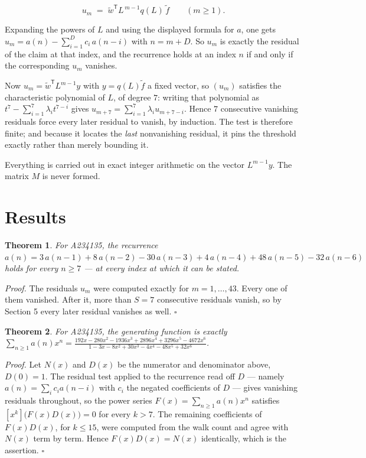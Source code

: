 \documentclass[11pt]{article}
\newtheorem{theorem}{Theorem}
\theoremstyle{definition}
\begin{document}
\[u_m \;=\; \tilde w^{\mathsf T} L^{\,m-1} q(L)\,\tilde f \qquad (m \ge 1).\]

Expanding the powers of $L$ and using the displayed formula for $a$, one gets $u_m = a(n) - \sum_{i=1}^{D} c_i\,a(n-i)$ with $n = m + D$. So $u_m$ is exactly the residual of the claim at that index, and the recurrence holds at an index $n$ if and only if the corresponding $u_m$ vanishes.

Now $u_m = \tilde w^{\mathsf T} L^{m-1} y$ with $y = q(L)\tilde f$ a fixed vector, so $(u_m)$ satisfies the characteristic polynomial of $L$, of degree $7$: writing that polynomial as $t^{7} - \sum_{i=1}^{7} \lambda_i t^{7-i}$ gives $u_{m+7} = \sum_{i=1}^{7} \lambda_i u_{m+7-i}$. Hence $7$ consecutive vanishing residuals force every later residual to vanish, by induction. The test is therefore finite; and because it locates the {\itshape last} nonvanishing residual, it pins the threshold exactly rather than merely bounding it.

Everything is carried out in exact integer arithmetic on the vector $L^{m-1}y$. The matrix $M$ is never formed.

\section{Results}

\begin{theorem} For A234135, the recurrence $a(n) = 3\,a(n-1) + 8\,a(n-2) - 30\,a(n-3) + 4\,a(n-4) + 48\,a(n-5) - 32\,a(n-6)$ holds for every $n \ge 7$ --- at every index at which it can be stated.\end{theorem}

{\itshape Proof.} The residuals $u_m$ were computed exactly for $m = 1,\dots,43$. Every one of them vanished. After it, more than $S = 7$ consecutive residuals vanish, so by Section 5 every later residual vanishes as well. $\square$

\begin{theorem} For A234135, the generating function is exactly $\sum_{n\ge 1} a(n)x^n = \frac{192x - 280x^{2} - 1936x^{3} + 2896x^{4} + 3296x^{5} - 4672x^{6}}{1 - 3x - 8x^{2} + 30x^{3} - 4x^{4} - 48x^{5} + 32x^{6}}$.\end{theorem}

{\itshape Proof.} Let $N(x)$ and $D(x)$ be the numerator and denominator above, $D(0)=1$. The residual test applied to the recurrence read off $D$ --- namely $a(n) = \sum_i c_i a(n-i)$ with $c_i$ the negated coefficients of $D$ --- gives vanishing residuals throughout, so the power series $F(x)=\sum_{n\ge 1}a(n)x^n$ satisfies $[x^k]\bigl(F(x)D(x)\bigr) = 0$ for every $k > 7$. The remaining coefficients of $F(x)D(x)$, for $k \le 15$, were computed from the walk count and agree with $N(x)$ term by term. Hence $F(x)D(x) = N(x)$ identically, which is the assertion. $\square$
\end{document}
